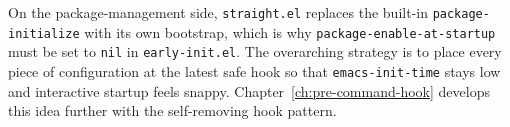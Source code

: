 On the package-management side, \texttt{straight.el} replaces the
built-in \texttt{package-initialize} with its own bootstrap, which is why
\texttt{package-enable-at-startup} must be set to \texttt{nil} in
\texttt{early-init.el}.  The overarching strategy is to place every piece
of configuration at the latest safe hook so that \texttt{emacs-init-time}
stays low and interactive startup feels snappy.
Chapter~\ref{ch:pre-command-hook} develops this idea further with the
self-removing hook pattern.
